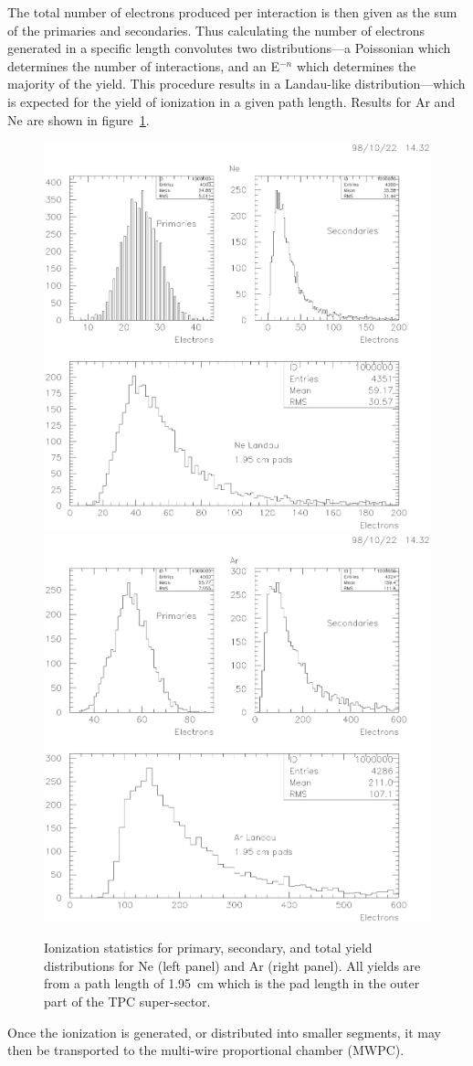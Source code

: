 \documentclass[twoside]{article}
\begin{document}
The total number of electrons produced per interaction is
then given as the sum of the primaries and secondaries.
Thus calculating the number of electrons generated in a specific
length convolutes two distributions---a Poissonian which determines
the number of interactions, and an E$^{-n}$ which determines
the majority of the yield.  This procedure results in 
a Landau-like distribution---which is expected for the yield of 
ionization in a given path length.  Results for Ar and Ne are
shown in figure~\ref{fig:landauGases}.
\begin{figure}[htb]
\begin{center}
\includegraphics[bbllx=33pt,bblly=150pt,bburx=569pt,bbury=698pt,width=.45\textwidth]{./pics/landauNe.ps}
\includegraphics[bbllx=33pt,bblly=150pt,bburx=569pt,bbury=698pt,width=.45\textwidth]{./pics/landauAr.ps}
\caption{Ionization statistics for primary, secondary, and total yield
  distributions for Ne (left panel) and Ar (right panel).  All yields
  are from a path length of 1.95~cm which is the pad length in the
  outer part of the TPC super-sector.}
\label{fig:landauGases}
\end{center}
\end{figure}
Once the ionization is generated, or distributed into smaller
segments, it may then be transported to the multi-wire proportional
chamber (MWPC).
\end{document}

